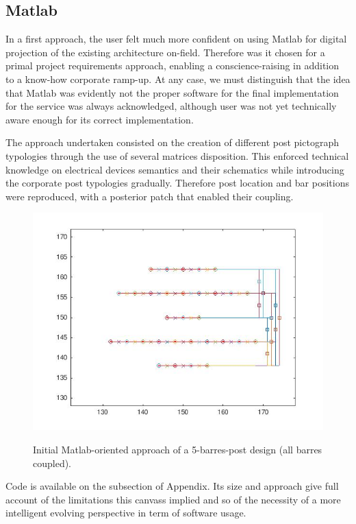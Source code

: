\subsection{Matlab}
\label{sec:approach:software:matlab}

In a first approach, the user felt much more confident on using Matlab for digital projection of the existing architecture on-field. Therefore was it chosen for a primal project requirements approach, enabling a conscience-raising in addition to a know-how corporate ramp-up. At any case, we must distinguish that the idea that Matlab was evidently not the proper software for the final implementation for the service was always acknowledged, although user was not yet technically aware enough for its correct implementation. 

The approach undertaken consisted on the creation of different post pictograph typologies through the use of several matrices disposition. This enforced technical knowledge on electrical devices semantics and their schematics while introducing the corporate post typologies gradually. Therefore post location and bar positions were reproduced, with a posterior patch that enabled their coupling.

\begin{figure}[h!]
    \bigskip
    \begin{center}
        \parbox[t]{.475\textwidth} {%
        \href{}
            {\includegraphics[width=.475\textwidth]{0.figuras/Matlab_postes_barres_generation.jpg}}}\hfill
        \parbox[t]{.475\textwidth}{\caption{Initial Matlab-oriented approach of a 5-barres-post design (all barres coupled).}
            \label{fig:matlab_design}}
    \end{center}
\end{figure}

Code is available on the  subsection of Appendix. Its size and approach give full account of the limitations this canvass implied and so of the necessity of a more intelligent evolving perspective in term of software usage. 


